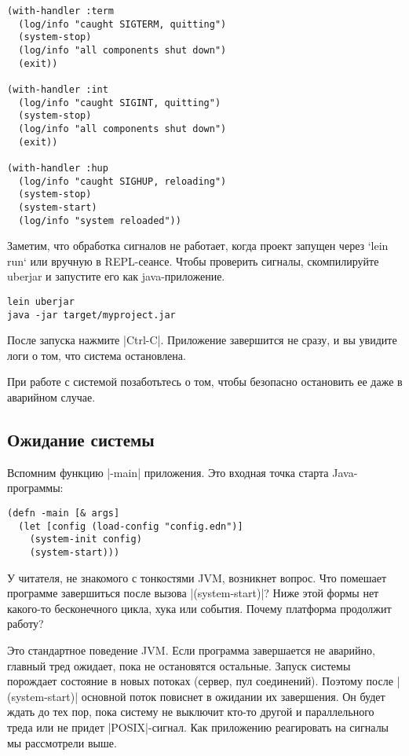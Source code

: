 \begin{verbatim}
(with-handler :term
  (log/info "caught SIGTERM, quitting")
  (system-stop)
  (log/info "all components shut down")
  (exit))

(with-handler :int
  (log/info "caught SIGINT, quitting")
  (system-stop)
  (log/info "all components shut down")
  (exit))

(with-handler :hup
  (log/info "caught SIGHUP, reloading")
  (system-stop)
  (system-start)
  (log/info "system reloaded"))
\end{verbatim}

Заметим, что обработка сигналов не работает, когда проект запущен через `lein
run` или вручную в REPL-сеансе. Чтобы проверить сигналы, скомпилируйте uberjar и
запустите его как java-приложение.

\begin{verbatim}
lein uberjar
java -jar target/myproject.jar
\end{verbatim}

После запуска нажмите \spverb|Ctrl-C|. Приложение завершится не сразу, и вы увидите
логи о том, что система остановлена.

При работе с системой позаботьтесь о том, чтобы безопасно остановить ее даже в
аварийном случае.

\subsection{Ожидание системы}

Вспомним функцию \spverb|-main| приложения. Это входная точка старта Java-программы:

\begin{verbatim}
(defn -main [& args]
  (let [config (load-config "config.edn")]
    (system-init config)
    (system-start)))
\end{verbatim}

У читателя, не знакомого с тонкостями JVM, возникнет вопрос. Что помешает
программе завершиться после вызова \spverb|(system-start)|? Ниже этой формы нет
какого-то бесконечного цикла, хука или события. Почему платформа продолжит
работу?

Это стандартное поведение JVM. Если программа завершается не аварийно, главный
тред ожидает, пока не остановятся остальные. Запуск системы порождает состояние
в новых потоках (сервер, пул соединений). Поэтому после \spverb|(system-start)|
основной поток повиснет в ожидании их завершения. Он будет ждать до тех пор,
пока систему не выключит кто-то другой и параллельного треда или не придет
\spverb|POSIX|-сигнал. Как приложению реагировать на сигналы мы рассмотрели выше.

